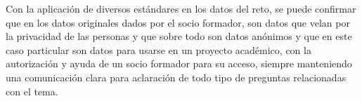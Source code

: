 \documentclass[runningheads]{llncs}
\begin{document}
Con la aplicación de diversos estándares en los datos del reto, se puede confirmar que en los datos originales dados por el socio formador, son datos que velan por la privacidad de las personas y que sobre todo son datos anónimos y que en este caso particular son datos para usarse en un proyecto académico, con la autorización y ayuda de un socio formador para su acceso, siempre manteniendo una comunicación clara para aclaración de todo tipo de preguntas relacionadas con el tema.



\end{document}
